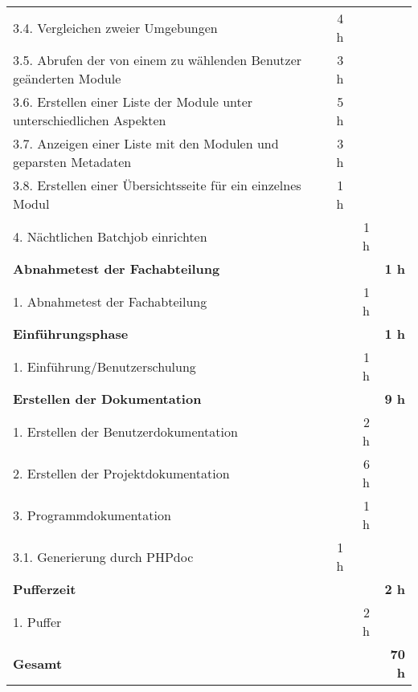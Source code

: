 \begin{tabularx}{\textwidth}{Xrrr}
3.4. Vergleichen zweier Umgebungen & 4 h   &       &  \\
\rowcolor{odd}3.5. Abrufen der von einem zu wählenden Benutzer geänderten Module & 3 h   &       &  \\
3.6. Erstellen einer Liste der Module unter unterschiedlichen Aspekten & 5 h   &       &  \\
\rowcolor{odd}3.7. Anzeigen einer Liste mit den Modulen und geparsten Metadaten & 3 h   &       &  \\
3.8. Erstellen einer Übersichtsseite für ein einzelnes Modul & 1 h   &       &  \\
\rowcolor{odd}4. Nächtlichen Batchjob einrichten &       & 1 h   &  \\
\rowcolor{heading}\textbf{Abnahmetest der Fachabteilung} & \textbf{} & \textbf{} & \textbf{1 h} \\
1. Abnahmetest der Fachabteilung &       & 1 h   &  \\
\rowcolor{heading}\textbf{Einführungsphase} & \textbf{} & \textbf{} & \textbf{1 h} \\
1. Einführung/Benutzerschulung &       & 1 h   &  \\
\rowcolor{heading}\textbf{Erstellen der Dokumentation} & \textbf{} & \textbf{} & \textbf{9 h} \\
1. Erstellen der Benutzerdokumentation &       & 2 h   &  \\
\rowcolor{odd}2. Erstellen der Projektdokumentation &       & 6 h   &  \\
3. Programmdokumentation &       & 1 h   &  \\
\rowcolor{odd}3.1. Generierung durch PHPdoc & 1 h   &       &  \\
\rowcolor{heading}\textbf{Pufferzeit} & \textbf{} & \textbf{} & \textbf{2 h} \\
1. Puffer &       & 2 h   &  \\
\hline
\hline
\rowcolor{heading}\textbf{Gesamt} & \textbf{} & \textbf{} & \textbf{70 h} \\
\end{tabularx}
